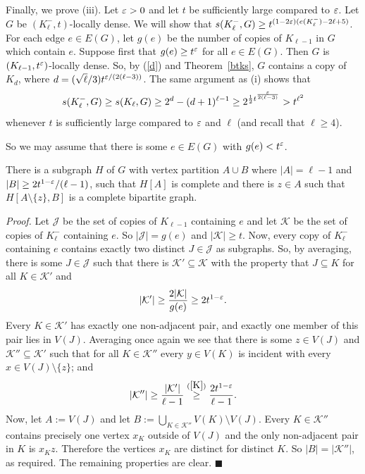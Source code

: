 \documentclass[12pt]{amsart}
\begin{document}
\medskip
\noindent
Finally, we prove (iii).
Let ${\varepsilon} > 0$ and let $t$ be sufficiently large compared to ${\varepsilon}$.
Let $G$ be $(K_\ell^-,t)$-locally dense.
We will show that $s(K_\ell^-,G) \geq t^{(1-2{\varepsilon})(e(K_\ell^-)-2\ell+5)}$.
For each edge $e \in E(G)$, let $g(e)$ be the number of copies of $K_{\ell-1}$ in $G$ which contain $e$.
Suppose first that $g(e) \geq t^{{\varepsilon}}$ for all $e \in E(G)$.
Then $G$ is $(K_{\ell-1},t^{{\varepsilon}})$-locally dense.
So, by (\ref{d}) and Theorem~\ref{btks}, $G$ contains a copy of $K_d$, where $d = (\sqrt{\ell}/3) t^{{\varepsilon}/(2(\ell-3))}$.
The same argument as (i) shows that
$$
s(K_\ell^-,G) \geq s(K_\ell,G) \geq 2^d - (d+1)^{\ell-1} \geq 2^{\frac{1}{2}t^{\frac{{\varepsilon}}{2(\ell-3)}}} > t^{\ell^2}
$$
whenever $t$ is sufficiently large compared to ${\varepsilon}$ and $\ell$ (and recall that $\ell \geq 4$).

So we may assume that there is some $e \in E(G)$ with $g(e) < t^{{\varepsilon}}$.

\begin{claim}
There is a subgraph $H$ of $G$ with vertex partition $A \cup B$ where $|A|=\ell-1$ and $|B| \geq 2t^{1-{\varepsilon}}/(\ell-1)$, such that $H[A]$ is complete and there is $z \in A$ such that $H[A\setminus \lbrace z \rbrace, B]$ is a complete bipartite graph.
\end{claim}

\medskip
\noindent
\emph{Proof.}
Let $\mathcal{J}$ be the set of copies of $K_{\ell-1}$ containing $e$ and let $\mathcal{K}$ be the set of copies of $K_{\ell}^-$ containing $e$.
So $|\mathcal{J}| = g(e)$ and $|\mathcal{K}| \geq t$.
Now, every copy of $K_\ell^-$ containing $e$ contains exactly two distinct $J \in \mathcal{J}$ as subgraphs.
So, by averaging, there is some $J \in \mathcal{J}$ such that there is $\mathcal{K}' \subseteq \mathcal{K}$ with the property that $J \subseteq K$ for all $K \in \mathcal{K}'$ and
\begin{equation}\label{K}
|\mathcal{K}'| \geq \frac{2|\mathcal{K}|}{g(e)}\ge 2t^{1-{\varepsilon}}.
\end{equation}
Every $K \in \mathcal{K}'$ has exactly one non-adjacent pair, and exactly one member of this pair lies in $V(J)$.
Averaging once again we see that there is some $z \in V(J)$ and $\mathcal{K}'' \subseteq \mathcal{K}'$ such that for all $K \in \mathcal{K}''$ every $y \in V(K)$ is incident with every $x \in V(J) \setminus \lbrace z \rbrace$; and
$$
|\mathcal{K}''| \geq \frac{|\mathcal{K}'|}{\ell-1} \stackrel{(\ref{K})}{\geq} \frac{2t^{1-{\varepsilon}}}{\ell-1}.
$$
Now, let $A := V(J)$ and let $B := \bigcup_{K \in \mathcal{K}''}V(K) \setminus V(J)$.
Every $K \in \mathcal{K''}$ contains precisely one vertex $x_K$ outside of $V(J)$ and the only non-adjacent pair in $K$ is $x_Kz$.
Therefore the vertices $x_K$ are distinct for distinct $K$.
So $|B| = |\mathcal{K}''|$, as required.
The remaining properties are clear.
\hfill$\blacksquare$
\end{document}
